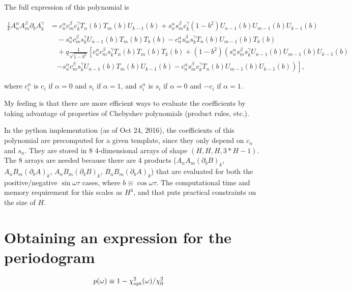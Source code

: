 \documentclass[notitlepage]{article}
\newcommand{\dA}{(\partial_b A)}
\newcommand{\dB}{(\partial_b B)}
\begin{document}
The full expression of this polynomial is 


\newcommand{\cna}{c_n^{\alpha}}
\newcommand{\cmb}{c_m^{\beta}}
\newcommand{\ckg}{c_k^{\gamma}}
\newcommand{\sna}{s_n^{\alpha}}
\newcommand{\smb}{s_m^{\beta}}
\newcommand{\skg}{s_k^{\gamma}}

\newcommand{\Tn}{T_n(b)}
\newcommand{\Tm}{T_m(b)}
\newcommand{\Tk}{T_k(b)}

\newcommand{\Un}{U_{n-1}(b)}
\newcommand{\Um}{U_{m-1}(b)}
\newcommand{\Uk}{U_{k-1}(b)}

\begin{align*}
\frac{1}{k}A^\alpha_n A^{\beta}_m \partial_b A_k^{\gamma} &= \cna\cmb\ckg \Tn\Tm\Uk + \sna\smb\ckg\left(1-b^2\right)\Un\Um\Uk \\
		&\quad - \sna\cmb\skg\Un\Tm\Tk - \cna\smb\skg\Tn\Um\Tk \\
		&\quad + q\frac{1}{\sqrt{1 - b^2}}\left[\cna\cmb\skg\Tn\Tm\Tk + \left(1-b^2\right)\left( \sna\smb\skg\Un\Um\Uk \right.\right.\\
		&\quad \left.\left. - \sna\cmb\skg\Un\Tm\Uk - \cna\smb\ckg\Tn\Um\Uk \right)\right],
\end{align*}

where $c_i^{\alpha}$ is $c_i$ if $\alpha=0$ and $s_i$ if $\alpha=1$, and $s_i^\alpha$ is $s_i$ if $\alpha=0$ and $-c_i$ if $\alpha=1$.

My feeling is that there are more efficient ways to evaluate the 
coefficients by taking advantage of properties of Chebyshev 
polynomials (product rules, etc.).

In the python implementation (as of Oct 24, 2016), the coefficients 
of this polynomial are precomputed for a given template, since
they only depend on $c_n$ and $s_n$. They are stored in 8 
4-dimensional arrays of shape $(H, H, H, 3*H - 1)$. 
The 8 arrays are needed because there are 4 products ($A_nA_m\dB_k$, 
$A_nB_m\dA_k$, $A_nB_m\dB_k$, $B_nB_m\dA_k$) that are evaluated for 
both the positive/negative $\sin\omega\tau$ cases, where 
$b\equiv \cos\omega\tau$. The computational time and memory 
requirement for this scales as $H^4$, and that puts practical
constraints on the size of $H$.

\section{Obtaining an expression for the periodogram}

\begin{align*}
p(\omega) &\equiv 1 - \chi^2_{\rm opt}(\omega) / \chi^2_0
\end{align*}
\end{document}
